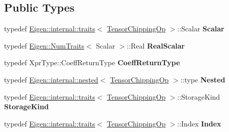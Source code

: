 \subsection*{Public Types}
\begin{DoxyCompactItemize}
\item 
\mbox{\label{class_eigen_1_1_tensor_chipping_op_a6697915d123db4a15cc0517000ef58da}} 
typedef \hyperlink{struct_eigen_1_1internal_1_1traits}{Eigen\+::internal\+::traits}$<$ \hyperlink{class_eigen_1_1_tensor_chipping_op}{Tensor\+Chipping\+Op} $>$\+::Scalar {\bfseries Scalar}
\item 
\mbox{\label{class_eigen_1_1_tensor_chipping_op_a9db513cf5c37618638d35aaf053baeda}} 
typedef \hyperlink{group___core___module_struct_eigen_1_1_num_traits}{Eigen\+::\+Num\+Traits}$<$ Scalar $>$\+::Real {\bfseries Real\+Scalar}
\item 
\mbox{\label{class_eigen_1_1_tensor_chipping_op_af6bcebbf33152e4e7b38546156969e0c}} 
typedef Xpr\+Type\+::\+Coeff\+Return\+Type {\bfseries Coeff\+Return\+Type}
\item 
\mbox{\label{class_eigen_1_1_tensor_chipping_op_a266ace2a06b1780e5dc356e39440aca0}} 
typedef \hyperlink{struct_eigen_1_1internal_1_1nested}{Eigen\+::internal\+::nested}$<$ \hyperlink{class_eigen_1_1_tensor_chipping_op}{Tensor\+Chipping\+Op} $>$\+::type {\bfseries Nested}
\item 
\mbox{\label{class_eigen_1_1_tensor_chipping_op_a1db78b64454b7be7abc167005af51a8a}} 
typedef \hyperlink{struct_eigen_1_1internal_1_1traits}{Eigen\+::internal\+::traits}$<$ \hyperlink{class_eigen_1_1_tensor_chipping_op}{Tensor\+Chipping\+Op} $>$\+::Storage\+Kind {\bfseries Storage\+Kind}
\item 
\mbox{\label{class_eigen_1_1_tensor_chipping_op_a0e7f21e2ee6dda5f33624309faaaf0a0}} 
typedef \hyperlink{struct_eigen_1_1internal_1_1traits}{Eigen\+::internal\+::traits}$<$ \hyperlink{class_eigen_1_1_tensor_chipping_op}{Tensor\+Chipping\+Op} $>$\+::Index {\bfseries Index}
\item 
\mbox{\label{class_eigen_1_1_tensor_chipping_op_a6697915d123db4a15cc0517000ef58da}} 

\end{DoxyCompactItemize}
